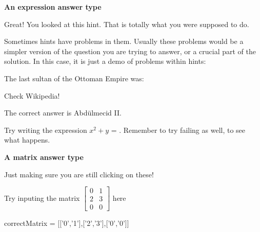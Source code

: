 \documentclass{ximera}
\begin{document}
\begin{question}
  \textbf{An expression answer type}
  \begin{solution}
    \begin{hint}
      Great!  You looked at this hint.  That is totally what you were supposed to do.
    \end{hint}
    \begin{hint}
      Sometimes hints have problems in them.  Usually these problems would be a simpler version of the question you are trying to answer,
      or a crucial part of the solution.  In this case, it is just a demo of problems within hints:
      \begin{question}
        The last sultan of the Ottoman Empire was:
        \begin{solution}
          \begin{hint}
            Check Wikipedia!
          \end{hint}
          \begin{hint}
            The correct answer is Abdülmecid II.
          \end{hint}
          \begin{multiple-choice}
          \end{multiple-choice}
        \end{solution}
      \end{question}
    \end{hint}
    Try writing the expression $x^2+y$ = .  Remember to try failing as well, to see what happens.
  \end{solution}
\end{question}

\begin{question}
  \textbf{A matrix answer type}
  \begin{solution}
    \begin{hint}
      Just making sure you are still clicking on these!
    \end{hint}
    Try inputing the matrix $\begin{bmatrix}  0&1\\2&3\\0&0\end{bmatrix}$ here
    \begin{matrix-answer}[name=M]
      correctMatrix = [['0','1'],['2','3'],['0','0']]
    \end{matrix-answer}
  \end{solution}
\end{question}
\end{document}

